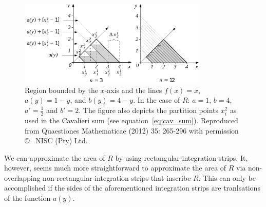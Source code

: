 \documentclass[twoside,reqno,11pt]{fcaa-var} %
\begin{document}
\begin{figure}[htb]
\centering
\includegraphics[width=0.8\textwidth]{fig13.pdf}
\caption{Region bounded by the $x$-axis and the lines $f(x)=x$, $a(y)=1-y$, and $b(y)=4-y$. In the case of $R$: $a=1$, $b=4$, $a'=\frac{1}{2}$ and $b'=2$. The figure also depicts the partition points $x_i^2$ as used in the Cavalieri sum (see equation~\eqref{eq:cav_sum}). Reproduced from Quaestiones Mathematicae (2012) 35: 265-296 with permission \copyright~ NISC (Pty) Ltd.}
\label{fig:caval2}
\end{figure}


\noindent
We can approximate the area of $R$ by using rectangular integration strips. It, however, seems much more straightforward to approximate the area of $R$ via non-overlapping non-rectangular integration strips that inscribe $R$. This can only be accomplished if the sides of the aforementioned integration strips are tranlsations of the function $a(y)$.\\
\end{document}
